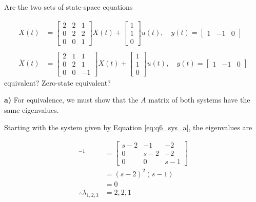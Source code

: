 \begin{question}{6}
Are the two sets of state-space equations

\begin{align}
  \dot{X}(t) &=
  \begin{bmatrix}
    2 & 2 & 1 \\
    0 & 2 & 2 \\
    0 & 0 & 1
  \end{bmatrix} X(t)
  +
  \begin{bmatrix}
    1 \\ 1 \\ 0
  \end{bmatrix}
  u(t),
  \quad
  y(t) =
  \begin{bmatrix}
    1 & -1 & 0
  \end{bmatrix} \label{eq:q6_sys_a}
  \\ \nonumber \\
  \dot{X}(t) &=
  \begin{bmatrix}
    2 & 1 &  1 \\
    0 & 2 &  1 \\
    0 & 0 & -1
  \end{bmatrix} X(t)
  +
  \begin{bmatrix}
    1 \\ 1 \\ 0
  \end{bmatrix}
  u(t),
  \quad
  y(t) =
  \begin{bmatrix}
    1 & -1 & 0
  \end{bmatrix} \label{eq:q6_sys_b}
\end{align}
\noindent equivalent? Zero-state equivalent?
\end{question}

\noindent \textbf{a)} For equivalence, we must show that the $A$ matrix of both
systems have the same eigenvalues.

Starting with the system given by Equation \ref{eq:q6_sys_a}, the eigenvalues
are

\begin{align}
  [s \mathbb{I} - A]^{-1} &=
  \begin{bmatrix}
    s-2 & -1  & -2 \\
    0   & s-2 & -2 \\
    0   & 0   & s-1
  \end{bmatrix} \label{eq:q6_sys_a_inv} \\
  &= (s-2)^2 (s-1) \nonumber \\
  &= 0 \nonumber \\
  \therefore
  \lambda_{1,2,3} &= 2, 2, 1 \label{eq:q6_sys_a_ev}
\end{align}

